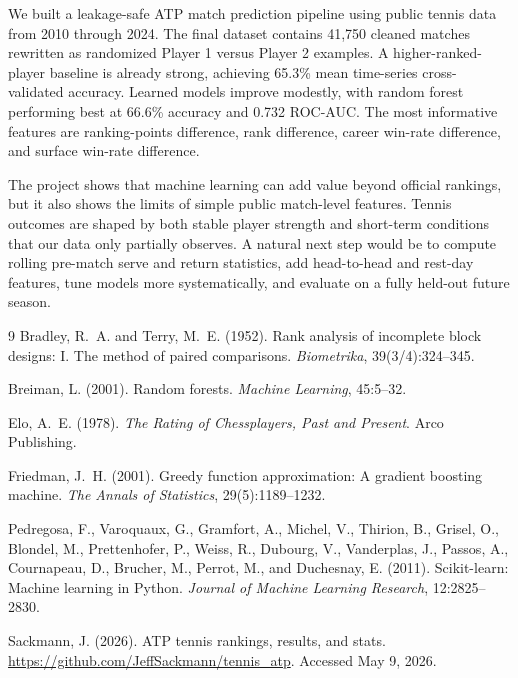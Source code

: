 \documentclass{article}
\begin{document}
We built a leakage-safe ATP match prediction pipeline using public tennis data from 2010 through 2024. The final dataset contains 41,750 cleaned matches rewritten as randomized Player 1 versus Player 2 examples. A higher-ranked-player baseline is already strong, achieving 65.3\% mean time-series cross-validated accuracy. Learned models improve modestly, with random forest performing best at 66.6\% accuracy and 0.732 ROC-AUC. The most informative features are ranking-points difference, rank difference, career win-rate difference, and surface win-rate difference.

The project shows that machine learning can add value beyond official rankings, but it also shows the limits of simple public match-level features. Tennis outcomes are shaped by both stable player strength and short-term conditions that our data only partially observes. A natural next step would be to compute rolling pre-match serve and return statistics, add head-to-head and rest-day features, tune models more systematically, and evaluate on a fully held-out future season.

\clearpage
\begin{thebibliography}{9}
Bradley, R.~A. and Terry, M.~E. (1952).
\newblock Rank analysis of incomplete block designs: I. The method of paired comparisons.
\newblock \emph{Biometrika}, 39(3/4):324--345.

Breiman, L. (2001).
\newblock Random forests.
\newblock \emph{Machine Learning}, 45:5--32.

Elo, A.~E. (1978).
\newblock \emph{The Rating of Chessplayers, Past and Present}.
\newblock Arco Publishing.

Friedman, J.~H. (2001).
\newblock Greedy function approximation: A gradient boosting machine.
\newblock \emph{The Annals of Statistics}, 29(5):1189--1232.

Pedregosa, F., Varoquaux, G., Gramfort, A., Michel, V., Thirion, B., Grisel, O., Blondel, M., Prettenhofer, P., Weiss, R., Dubourg, V., Vanderplas, J., Passos, A., Cournapeau, D., Brucher, M., Perrot, M., and Duchesnay, E. (2011).
\newblock Scikit-learn: Machine learning in Python.
\newblock \emph{Journal of Machine Learning Research}, 12:2825--2830.

Sackmann, J. (2026).
\newblock ATP tennis rankings, results, and stats.
\newblock \url{https://github.com/JeffSackmann/tennis_atp}. Accessed May 9, 2026.

\end{thebibliography}
\end{document}
